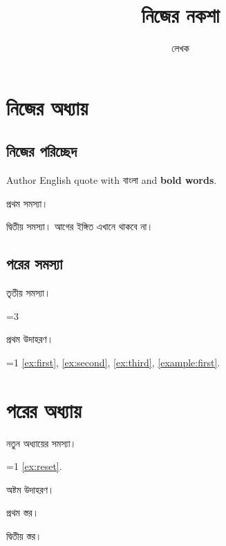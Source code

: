 \documentclass[11pt,oneside,openany]{bookbangla}
\title{নিজের নকশা}
\author{লেখক}
\date{}
\begin{document}
\ifdim\parindent=1em\else\errmessage{bookbangla-test-failed: paragraph override}\fi
\maketitle
\mainmatter
\chapter{নিজের অধ্যায়}
\section{নিজের পরিচ্ছেদ}
\begin{chapquote}[1em]{Author}
English quote with বাংলা and \textbf{bold words}.
\end{chapquote}
\begin{exercise}[hint={A first hint with $x=2$.}]\label{ex:first}
প্রথম সমস্যা।
\end{exercise}
\begin{exercise}\label{ex:second}
দ্বিতীয় সমস্যা। আগের ইঙ্গিত এখানে থাকবে না।
\end{exercise}
\section{পরের সমস্যা}
\begin{exercise}\label{ex:third}তৃতীয় সমস্যা।\end{exercise}
\ifnum\value{exercise}=3\else{}\fi
\begin{example}\label{example:first}প্রথম উদাহরণ।\end{example}
\ifnum\value{example}=1\else{}\fi
\autoref{ex:first}, \autoref{ex:second}, \autoref{ex:third}, \autoref{example:first}.
\chapter{পরের অধ্যায়}
\begin{exercise}\label{ex:reset}নতুন অধ্যায়ের সমস্যা।\end{exercise}
\ifnum\value{exercise}=1\else{}\fi
\autoref{ex:reset}.
\setcounter{example}{7}
\begin{example}\label{example:continuous}অষ্টম উদাহরণ।\end{example}
\begin{smartlist}[label=--,leftmargin=2em,itemsep=0pt]
\item প্রথম স্তর।
\begin{smartlist}[label=+]\item দ্বিতীয় স্তর।\end{smartlist}
\end{smartlist}
\appendix
\end{document}
